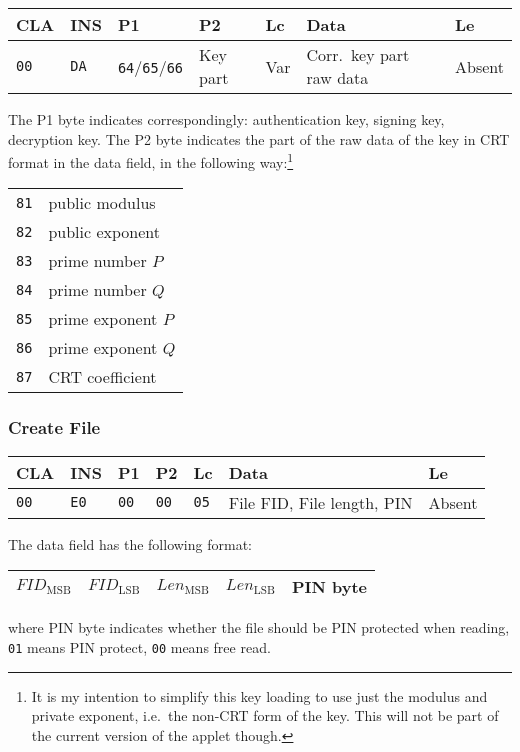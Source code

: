 \documentclass{article}
\begin{document}
\begin{flushleft}
\begin{tabular}{|l|l|l|l|l|l|l|}
\hline
CLA & INS & P1 & P2 & Lc & Data & Le \\
\hline
\texttt{00} & \texttt{DA} & \texttt{64}/\texttt{65}/\texttt{66} & Key part &
Var & Corr.\ key part raw data & Absent \\
\hline
\end{tabular}
\end{flushleft}
The P1 byte indicates correspondingly: authentication key, signing key, decryption key. 
The P2 byte indicates the part of the raw data of the key in CRT format in the data field, 
in the following way:\footnote{It is my intention to simplify this key loading to use 
just the modulus and private exponent, i.e.\ the non-CRT form of the key. This will not be part of
the current version of the applet though.}
\begin{flushleft}
\begin{tabular}{|l|l|}
\hline
\texttt{81} & public modulus\\
\texttt{82} & public exponent\\
\texttt{83} & prime number $P$\\
\texttt{84} & prime number $Q$\\
\texttt{85} & prime exponent $P$\\
\texttt{86} & prime exponent $Q$\\
\texttt{87} & CRT coefficient\\
\hline
\end{tabular}
\end{flushleft}

\subsubsection{Create File}

\begin{flushleft}
\begin{tabular}{|l|l|l|l|l|l|l|}
\hline
CLA & INS & P1 & P2 & Lc & Data & Le \\
\hline
\texttt{00} & \texttt{E0} & \texttt{00}} & \texttt{00} &
\texttt{05} & File FID, File length, PIN  & Absent \\
\hline
\end{tabular}
\end{flushleft}
The data field has the following format:
\begin{flushleft}
\begin{tabular}{|l|l|l|l|l|}
\hline
$\mathit{FID}_{\mathrm{MSB}}$ & $\mathit{FID}_{\mathrm{LSB}}$ &
$\mathit{Len}_{\mathrm{MSB}}$ & $\mathit{Len}_{\mathrm{LSB}}$ &
PIN byte \\
\hline
\end{tabular}
\end{flushleft}
where PIN byte indicates whether the file should be PIN protected when reading, \texttt{01} means PIN protect,
\texttt{00} means free read.
\end{document}
